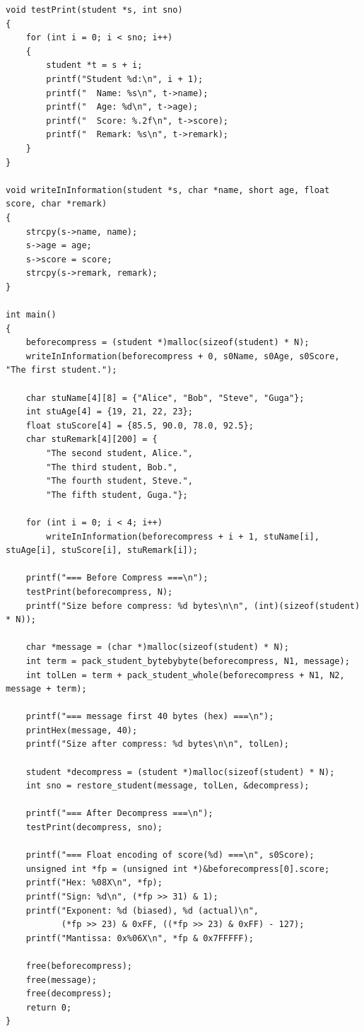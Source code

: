 \documentclass[12pt,a4paper]{ctexart}
\begin{document}
\begin{lstlisting}[basicstyle=\ttfamily\zihao{5},lineskip=-1pt]
void testPrint(student *s, int sno)
{
    for (int i = 0; i < sno; i++)
    {
        student *t = s + i;
        printf("Student %d:\n", i + 1);
        printf("  Name: %s\n", t->name);
        printf("  Age: %d\n", t->age);
        printf("  Score: %.2f\n", t->score);
        printf("  Remark: %s\n", t->remark);
    }
}

void writeInInformation(student *s, char *name, short age, float score, char *remark)
{
    strcpy(s->name, name);
    s->age = age;
    s->score = score;
    strcpy(s->remark, remark);
}

int main()
{
    beforecompress = (student *)malloc(sizeof(student) * N);
    writeInInformation(beforecompress + 0, s0Name, s0Age, s0Score, "The first student.");

    char stuName[4][8] = {"Alice", "Bob", "Steve", "Guga"};
    int stuAge[4] = {19, 21, 22, 23};
    float stuScore[4] = {85.5, 90.0, 78.0, 92.5};
    char stuRemark[4][200] = {
        "The second student, Alice.",
        "The third student, Bob.",
        "The fourth student, Steve.",
        "The fifth student, Guga."};

    for (int i = 0; i < 4; i++)
        writeInInformation(beforecompress + i + 1, stuName[i], stuAge[i], stuScore[i], stuRemark[i]);

    printf("=== Before Compress ===\n");
    testPrint(beforecompress, N);
    printf("Size before compress: %d bytes\n\n", (int)(sizeof(student) * N));

    char *message = (char *)malloc(sizeof(student) * N);
    int term = pack_student_bytebybyte(beforecompress, N1, message);
    int tolLen = term + pack_student_whole(beforecompress + N1, N2, message + term);

    printf("=== message first 40 bytes (hex) ===\n");
    printHex(message, 40);
    printf("Size after compress: %d bytes\n\n", tolLen);

    student *decompress = (student *)malloc(sizeof(student) * N);
    int sno = restore_student(message, tolLen, &decompress);

    printf("=== After Decompress ===\n");
    testPrint(decompress, sno);

    printf("=== Float encoding of score(%d) ===\n", s0Score);
    unsigned int *fp = (unsigned int *)&beforecompress[0].score;
    printf("Hex: %08X\n", *fp);
    printf("Sign: %d\n", (*fp >> 31) & 1);
    printf("Exponent: %d (biased), %d (actual)\n",
           (*fp >> 23) & 0xFF, ((*fp >> 23) & 0xFF) - 127);
    printf("Mantissa: 0x%06X\n", *fp & 0x7FFFFF);

    free(beforecompress);
    free(message);
    free(decompress);
    return 0;
}
\end{lstlisting}
\end{document}
